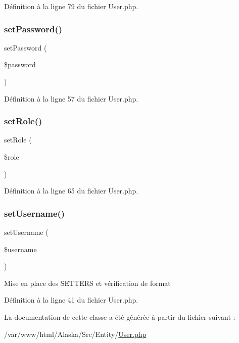 Définition à la ligne 79 du fichier User.\+php.

\mbox{\label{class_src_1_1_entity_1_1_user_a3e35c8d3dbb2c513c618a664389e0926}} 
\subsubsection{\texorpdfstring{set\+Password()}{setPassword()}}
{\footnotesize\ttfamily set\+Password (\begin{DoxyParamCaption}\item[{}]{\$password }\end{DoxyParamCaption})}



Définition à la ligne 57 du fichier User.\+php.

\mbox{\label{class_src_1_1_entity_1_1_user_aa9233284be00bee150c4982e73785b72}} 
\subsubsection{\texorpdfstring{set\+Role()}{setRole()}}
{\footnotesize\ttfamily set\+Role (\begin{DoxyParamCaption}\item[{}]{\$role }\end{DoxyParamCaption})}



Définition à la ligne 65 du fichier User.\+php.

\mbox{\label{class_src_1_1_entity_1_1_user_ac359b701a2ccaff746dd480f03314244}} 
\subsubsection{\texorpdfstring{set\+Username()}{setUsername()}}
{\footnotesize\ttfamily set\+Username (\begin{DoxyParamCaption}\item[{}]{\$username }\end{DoxyParamCaption})}

Mise en place des S\+E\+T\+T\+E\+RS et vérification de format 

Définition à la ligne 41 du fichier User.\+php.



La documentation de cette classe a été générée à partir du fichier suivant \+:\begin{DoxyCompactItemize}
\item 
/var/www/html/\+Alaska/\+Src/\+Entity/\hyperlink{_user_8php}{User.\+php}\end{DoxyCompactItemize}
